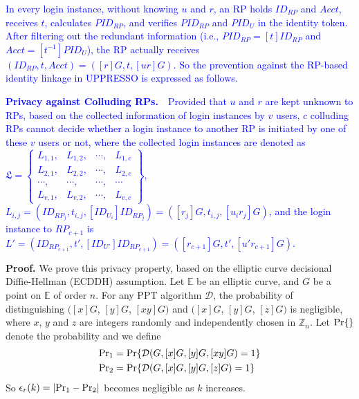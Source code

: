 \vspace{1mm}
\textcolor{blue}{In every login instance,
    without knowing $u$ and $r$,
    an RP holds $ID_{RP}$ and $Acct$, receives $t$, calculates $PID_{RP}$,
    and verifies $PID_{RP}$ and $PID_U$ in the identity token.
After filtering out the redundant information (i.e., $PID_{RP}= [t]{ID_{RP}}$ and $Acct = [t^{-1}]PID_{U}$),
    the RP actually receives $(ID_{RP}, t, Acct) = ([r]G, t, [ur]G)$.
So the prevention against the RP-based identity linkage in UPPRESSO is expressed as follows.}

\vspace{1mm}
\noindent\textcolor{blue}{\textbf{Privacy against Colluding RPs.}~~Provided that $u$ and $r$ are kept unknown to RPs,
based on the collected information of login instances by $v$ users,
$c$ colluding RPs cannot decide whether a login instance to another RP is initiated by one of these $v$ users or not,
    where
    the collected login instances are denoted as $\mathfrak{L}=\left\{ \begin{matrix}
L_{1,1}, & L_{1,2}, & \cdots, & L_{1,c}\\
L_{2,1}, & L_{2,2}, & \cdots, & L_{2,c}\\
\cdots, & \cdots, & \cdots, & \cdots\\
L_{v,1}, & L_{v,2}, & \cdots, & L_{v,c}
\end{matrix}\right\}$, $L_{i, j} = (ID_{RP_j}, t_{i, j}, [ID_{U_i}]{ID_{RP_j}}) = ([r_j]G, t_{i,j}, [u_ir_j]G)$,
    and the login instance to $RP_{c+1}$ is $L'=(ID_{RP_{c+1}}, t', [ID_{U'}]ID_{RP_{c+1}}) = ([r_{c+1}]G, t', [u'r_{c+1}]G)$.}


\vspace{0.75mm}
\noindent\textbf{Proof.}
We prove this privacy property,
 based on the elliptic curve decisional Diffie-Hellman (ECDDH) assumption. %
%
Let $\mathbb{E}$ be an elliptic curve,
    and $G$ be a point on $\mathbb{E}$ of order $n$.
For any PPT algorithm $\mathcal{D}$, the probability of distinguishing
 $([x]G$, $[y]G$, $[xy]G)$ and $([x]G$, $[y]G$, $[z]G)$
is negligible,
 where $x$, $y$ and $z$ are integers randomly and independently chosen in $\mathbb{Z}_n$.
Let  ${\rm Pr}\{\}$ denote the probability and
 we define
\begin{align*}
&{\rm Pr}_1 =  {\rm Pr}\{\mathcal{D}(G, [x]G, [y]G, [xy]G)=1\} \\
&{\rm Pr}_2 =  {\rm Pr}\{\mathcal{D}(G, [x]G, [y]G, [z]G)=1\}
\end{align*}
So $\epsilon_{r}(k) = |{\rm Pr}_1 - {\rm Pr}_2|$ becomes negligible as $k$ increases.

